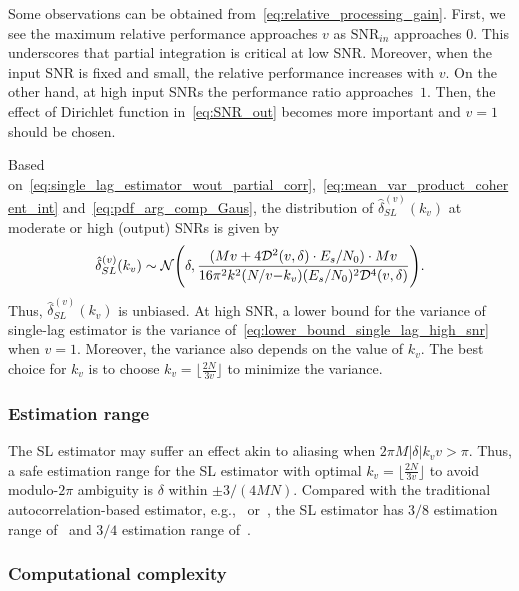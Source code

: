 Some observations can be obtained from~\eqref{eq:relative_processing_gain}.
First, we see the maximum relative performance approaches $v$ as
$\text{SNR}_{in}$ approaches 0.
This underscores that partial integration is critical at low SNR.
Moreover, when the input SNR is fixed and small, the relative performance
increases with $v$.
On the other hand, at high input SNRs the performance ratio approaches~$1$.
Then, the effect of Dirichlet function in~\eqref{eq:SNR_out}
becomes more important and
$v=1$ should be chosen.

Based on~\eqref{eq:single_lag_estimator_wout_partial_corr},~\eqref{eq:mean_var_product_coherent_int}
and~\eqref{eq:pdf_arg_comp_Gaus},
the distribution of $\hat{\delta}_{SL}^{(v)}(k_v)$ at moderate or high
(output) SNRs is given by
\begin{equation}
  \label{eq:lower_bound_single_lag_high_snr}
  \hat{\delta}_{SL}^{(v)}(k_v) \sim \mathcal{N} \Bigg(\delta,\frac{(Mv+4\mathcal{D}^2(v,\delta)\cdot E_s/N_0)\cdot Mv}{16\pi^2k^2(N/v{-}k_v)(E_s/N_0)^2\mathcal{D}^4(v,\delta)}\Bigg).
\end{equation}
Thus, $\hat{\delta}_{SL}^{(v)}(k_v)$ is unbiased. 
At high SNR, a lower bound for the variance of single-lag estimator is 
the variance of~\eqref{eq:lower_bound_single_lag_high_snr} when $v=1$.
Moreover, the variance also depends on
the value of $k_v$.
The best choice for $k_v$ is to choose 
$k_v=\lfloor\frac{2N}{3v}\rfloor$ to minimize the variance.

\subsubsection{Estimation range}
The SL estimator may suffer an effect
akin to aliasing when  $2\pi M|\delta|k_vv{>}\pi$.
Thus, a safe estimation range for the SL estimator with optimal
$k_v=\lfloor\frac{2N}{3v}\rfloor$
to avoid modulo-$2\pi$ ambiguity
is $\delta$ within $\pm 3/(4MN)$. 
Compared with the traditional autocorrelation-based estimator,
e.g.,~\cite{Luise_Reggiannini_95} or~\cite{Fitz_94},
the SL estimator has 
$3/8$ estimation range of~\cite{Luise_Reggiannini_95} and $3/4$ estimation range of~\cite{Fitz_94}.

\subsubsection{Computational complexity}

